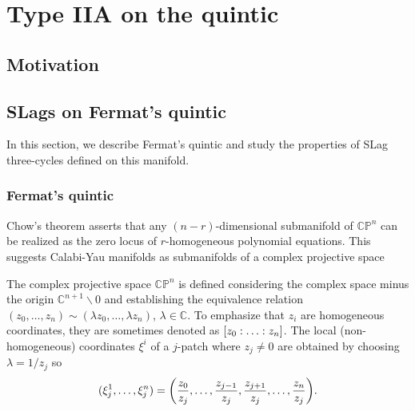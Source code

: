 \chapter{Type IIA on the quintic}

\section{Motivation}



\section{SLags on Fermat's quintic}
In this section, we describe Fermat's quintic and study the properties of SLag three-cycles 
defined on this manifold.

\subsection{Fermat's quintic}
Chow's theorem asserts  that any $(n-r)$-dimensional submanifold of $\mathbb{CP}^n$ can be realized as the zero locus of $r$-homogeneous polynomial equations.
This suggests Calabi-Yau manifolds as submanifolds of a complex projective space

The complex projective space $\mathbb{CP}^n$ is defined considering the complex space minus the origin $\mathbb{C}^{n+1}\backslash\qty{0}$
and establishing the equivalence relation $( z_0,\ldots, z_{n})\sim(\lambda z_0,\ldots,\lambda z_{n})$, $\lambda\in\mathbb C$.
To emphasize that $z_i$ are homogeneous coordinates, they are sometimes denoted as $\qty[z_0:\ldots:z_{n}]$.
The local (non-homogeneous) coordinates $\xi^i$ of a $j$-patch where $z_j\neq0$ are obtained by choosing $\lambda=1/z_j$ so
\begin{equation}
  (\xi^1_j,\ldots,\xi^n_j)=\qty(\frac{z_0}{z_j},\ldots,\frac{z_{j-1}}{z_j},\frac{z_{j+1}}{z_j},\ldots,\frac{z_{n}}{z_j}).
\end{equation}

